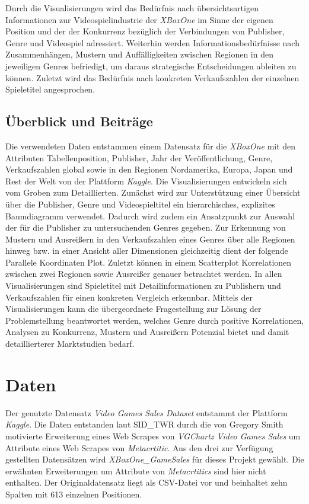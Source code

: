 \documentclass[usegeometry=true]{scrartcl}
\begin{document}
Durch die Visualisierungen wird das Bedürfnis nach übersichtsartigen Informationen zur Videospielindustrie der \textit{XBoxOne}
im Sinne der eigenen Position und der der Konkurrenz bezüglich der Verbindungen von Publisher, Genre und Videospiel adressiert.
Weiterhin werden Informationsbedürfnisse nach Zusammenhängen, Mustern und Auffälligkeiten zwischen Regionen in den jeweiligen Genres befriedigt, 
um daraus strategische Entscheidungen ableiten zu können.
Zuletzt wird das Bedürfnis nach konkreten Verkaufszahlen der einzelnen Spieletitel angesprochen.

\subsection{Überblick und Beiträge}
Die verwendeten Daten entstammen einem Datensatz für die \textit{XBoxOne} mit den Attributen 
Tabellenposition, Publisher, Jahr der Veröffentlichung, Genre, Verkaufszahlen global sowie in den Regionen Nordamerika, Europa, Japan und Rest der Welt von der Plattform \textit{Kaggle}.\cite{SID_TWR.} 
Die Visualisierungen entwickeln sich vom Groben zum Detaillierten.
Zunächst wird zur Unterstützung einer Übersicht über die Publisher, Genre und Videospieltitel ein hierarchisches, explizites Baumdiagramm verwendet. 
Dadurch wird zudem ein Ansatzpunkt zur Auswahl der für die Publisher zu untersuchenden Genres gegeben.
Zur Erkennung von Mustern und Ausreißern in den Verkaufszahlen eines Genres über alle Regionen hinweg bzw. in einer Ansicht aller Dimensionen gleichzeitig 
dient der folgende Parallele Koordinaten Plot.
Zuletzt können in einem Scatterplot Korrelationen zwischen zwei Regionen sowie Ausreißer genauer betrachtet werden.
In allen Visualisierungen sind Spieletitel mit Detailinformationen zu Publishern und Verkaufszahlen für einen konkreten Vergleich erkennbar.
Mittels der Visualisierungen kann die übergeordnete Fragestellung zur Lösung der Problemstellung beantwortet werden, 
welches Genre durch positive Korrelationen, Analysen zu Konkurrenz, Mustern und Ausreißern Potenzial bietet und damit detaillierterer Marktstudien bedarf.

\section{Daten}
Der genutzte Datensatz \textit{Video Games Sales Dataset} entstammt der Plattform \textit{Kaggle}.\cite{SID_TWR.} 
Die Daten entstanden laut SID\_TWR durch die von Gregory Smith motivierte Erweiterung eines Web Scrapes von \textit{VGChartz Video Games Sales} 
um Attribute eines Web Scrapes von \textit{Metacrtitic}.
Aus den drei zur Verfügung gestellten Datensätzen wird \textit{XBoxOne\_GameSales} für dieses Projekt gewählt. 
Die erwähnten Erweiterungen um Attribute von \textit{Metacrtitics} sind hier nicht enthalten. 
Der Originaldatensatz liegt als CSV-Datei vor und beinhaltet zehn Spalten mit 613 einzelnen Positionen. 
\end{document}
